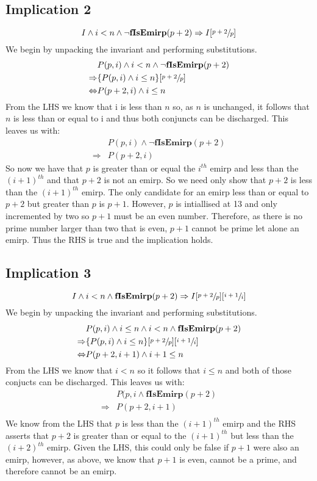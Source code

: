 \documentclass[a4paper]{article}
\begin{document}
\subsection{Implication 2}
$$I \land i < n \land \neg \textbf{fIsEmirp}(p+2) \Rightarrow I[\sfrac{p+2}{p}]$$
We begin by unpacking the invariant and performing substitutions.
\begin{align*}
		& P(p, i) \land i < n \land \neg \textbf{fIsEmirp}(p+2) \\
		\Rightarrow 	&	\{P(p, i) \land i \leq n \}[\sfrac{p+2}{p}] \\
		\Leftrightarrow		&	P(p+2, i) \land i \leq n
\end{align*}
From the LHS we know that i is less than $n$ so, as $n$ is unchanged, it follows that $n$ is less than or equal to i and thus both conjuncts can be discharged.
This leaves us with:
\begin{align*}
		& 	P(p, i) \land \neg \textbf{fIsEmirp}(p+2) \\
		\Rightarrow		&	P(p+2, i)
\end{align*}
So now we have that $p$ is greater than or equal the $i^{th}$ emirp and less than the $(i + 1)^{th}$ and that $p + 2$ is not an emirp. So we need only show that $p + 2$ is less than the $(i + 1)^{th}$ emirp. The only candidate for an emirp less than or equal to $p + 2$ but greater than $p$ is $p + 1$. However, $p$ is intiallised at 13 and only incremented by two so $p + 1$ must be an even number. Therefore, as there is no prime number larger than two that is even, $p + 1$ cannot be prime let alone an emirp. Thus the RHS is true and the implication holds.

\subsection{Implication 3}
$$ I \land i < n \land \textbf{fIsEmirp}(p+2) \Rightarrow I[\sfrac{p+2}{p}][\sfrac{i+1}{i}] $$
We begin by unpacking the invariant and performing substitutions.
\begin{align*}
		& 	P(p, i) \land i \leq n \land i < n \land \textbf{fIsEmirp}(p+2) \\
		\Rightarrow 	&	\{ P(p, i) \land i \leq n \}[\sfrac{p+2}{p}][\sfrac{i+1}{i}] \\
		\Leftrightarrow		&	P(p + 2, i + 1) \land i + 1 \leq n
\end{align*}
From the LHS we know that $i < n$ so it follows that $i \leq n$ and both of those conjucts can be discharged. This leaves us with:
\begin{align*}
		&	P(p, i \land \textbf{fIsEmirp}(p+2) \\
		\Rightarrow	&	P(p + 2, i + 1) \\
\end{align*}
We know from the LHS that $p$ is less than the $(i + 1)^{th}$ emirp and the RHS asserts that $p+2$ is greater than or equal to the $(i + 1)^{th}$ but less than the $(i + 2)^{th}$ emirp. Given the LHS, this could only be false if $p+1$ were also an emirp, however, as above, we know that $p+1$ is even, cannot be a prime, and therefore cannot be an emirp.
\end{document}
